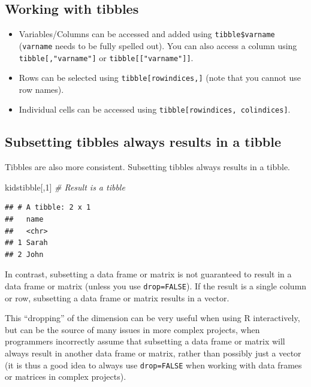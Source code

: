 \documentclass[
]{book}
\newenvironment{Shaded}{\begin{snugshade}}{\end{snugshade}}
\newcommand{\CommentTok}[1]{\textcolor[rgb]{0.56,0.35,0.01}{\textit{#1}}}
\newcommand{\DecValTok}[1]{\textcolor[rgb]{0.00,0.00,0.81}{#1}}
\newcommand{\NormalTok}[1]{#1}
\providecommand{\tightlist}{%
  \setlength{\itemsep}{0pt}\setlength{\parskip}{0pt}}
\begin{document}
\hypertarget{working-with-tibbles}{%
\subsection{Working with tibbles}\label{working-with-tibbles}}

\begin{itemize}
\tightlist
\item
  Variables/Columns can be accessed and added using \texttt{tibble\$varname} (\texttt{varname} needs to be fully spelled out). You can also access a column using \texttt{tibble{[},"varname"{]}} or \texttt{tibble{[}{[}"varname"{]}{]}}.
\item
  Rows can be selected using \texttt{tibble{[}rowindices,{]}} (note that you cannot use row names).
\item
  Individual cells can be accessed using \texttt{tibble{[}rowindices,\ colindices{]}}.
\end{itemize}

\hypertarget{subsetting-tibbles-always-results-in-a-tibble}{%
\subsection{Subsetting tibbles always results in a tibble}\label{subsetting-tibbles-always-results-in-a-tibble}}

Tibbles are also more consistent. Subsetting tibbles always results in a tibble.

\begin{Shaded}
\begin{Highlighting}[]
\NormalTok{kidstibble[,}\DecValTok{1}\NormalTok{]                            }\CommentTok{\# Result is a tibble}
\end{Highlighting}
\end{Shaded}

\begin{verbatim}
## # A tibble: 2 x 1
##   name 
##   <chr>
## 1 Sarah
## 2 John
\end{verbatim}

In contrast, subsetting a data frame or matrix is not guaranteed to result in a data frame or matrix (unless you use \texttt{drop=FALSE}). If the result is a single column or row, subsetting a data frame or matrix results in a vector.

This ``dropping'' of the dimension can be very useful when using R interactively, but can be the source of many issues in more complex projects, when programmers incorrectly assume that subsetting a data frame or matrix will always result in another data frame or matrix, rather than possibly just a vector (it is thus a good idea to always use \texttt{drop=FALSE} when working with data frames or matrices in complex projects).
\end{document}
